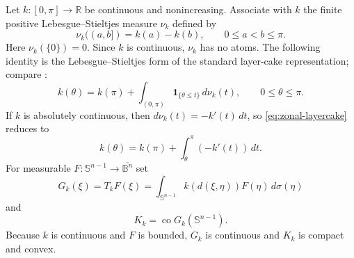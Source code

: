 \documentclass[11pt,reqno]{amsart}
\theoremstyle{remark}
\begin{document}
Let $k:[0,\pi]\to\mathbb R$ be continuous and nonincreasing.  Associate
with $k$ the finite positive Lebesgue--Stieltjes measure $\nu_k$ defined by
\[
 \nu_k((a,b])=k(a)-k(b),
 \qquad 0\le a<b\le\pi.
\]
Here $\nu_k(\{0\})=0$.  Since $k$ is continuous, $\nu_k$ has no atoms.  The following identity is
the Lebesgue--Stieltjes form of the standard layer-cake representation;
compare \cite[Theorem~1.13]{LiebLoss}:
\begin{equation}\label{eq:zonal-layercake}
 k(\theta)
 =
 k(\pi)
 +
 \int_{(0,\pi)}
 \mathbf1_{\{\theta\le t\}}\,d\nu_k(t),
 \qquad 0\le\theta\le\pi.
\end{equation}
If $k$ is absolutely continuous, then
$d\nu_k(t)=-k'(t)\,dt$, so \eqref{eq:zonal-layercake} reduces to
\[
k(\theta)=k(\pi)+\int_\theta^\pi (-k'(t))\,dt.
\]
For measurable $F:\mathbb S^{n-1}\to\overline{\mathbb B^n}$ set
\[
 G_k(\xi)=T_kF(\xi)
 =
 \int_{\mathbb S^{n-1}}
 k(d(\xi,\eta))F(\eta)\,d\sigma(\eta)
\]
and
\[
 K_k=\operatorname{co}G_k(\mathbb S^{n-1}).
\]
Because $k$ is continuous and $F$ is bounded, $G_k$ is continuous and
$K_k$ is compact and convex.
\end{document}
